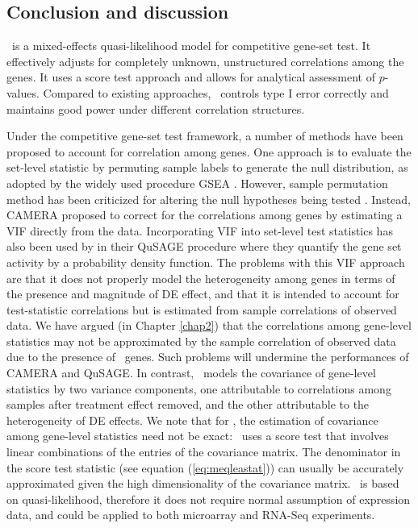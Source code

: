 	\subsection{Conclusion and discussion}\label{section:conclusion}
	
	 \OurMethod~is a mixed-effects quasi-likelihood model for competitive gene-set 
	test. It effectively adjusts for completely unknown, unstructured correlations among the genes. 
	It uses a score test approach and allows for analytical assessment of $p$-values. Compared to 
	existing approaches, \OurMethod~controls type I error correctly and maintains good power under 
	different correlation structures.  
	
	Under the competitive gene-set test framework, a number of methods have been
	proposed to account for correlation among genes. One approach is to evaluate the set-level 
	statistic by permuting sample labels to generate the null distribution, as adopted by the 
	widely used procedure GSEA \citep{subramanian2005gene}. However, sample permutation method has 
	been criticized for altering the null hypotheses being tested \citep{goeman2007analyzing, 
	khatri2012ten}. Instead, CAMERA \citep{wu2012camera} proposed to correct for the correlations 
	among genes by estimating a VIF	directly from the data. Incorporating VIF into set-level test 
	statistics has also been used by \citet{yaari2013quantitative} in their QuSAGE procedure where 
	they quantify the gene	 set activity by a probability density function. The 
	problems with this VIF approach are that it does not properly model the heterogeneity among 
	genes in terms of the presence and magnitude of DE effect, and that it is intended to account 
	for test-statistic correlations but is estimated from sample correlations of observed data. We 
	have argued (in Chapter \ref{chap2}) that the correlations among gene-level statistics may not 
	be approximated by the sample correlation of observed data due to the presence of \DED~genes. 
	Such problems will 
	undermine the performances of CAMERA and QuSAGE. In contrast, \OurMethod~models the covariance 
	of gene-level statistics by two variance components, one 
	attributable to correlations among samples after treatment effect 
	removed, and the other attributable to the heterogeneity of DE effects. We note that for	
	\OurMethod, the estimation of covariance among gene-level statistics need not be exact:
	\OurMethod~uses a score test that involves linear combinations of the entries of the covariance
	matrix. The denominator in the score test statistic (see equation (\ref{eq:meqleastat})) can 
	usually be accurately approximated given the high dimensionality of the covariance matrix. 
	\OurMethod~is based on quasi-likelihood, therefore it does not require normal assumption of 
	expression data, and could be applied to both microarray and RNA-Seq experiments. 
	
